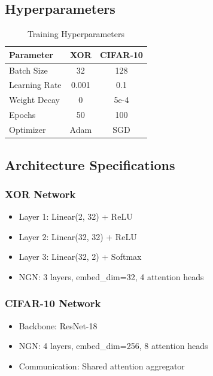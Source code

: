 \documentclass[11pt]{article}
\begin{document}
\subsection{Hyperparameters}

\begin{table}[H]
\centering
\caption{Training Hyperparameters}
\label{tab:hyperparams}
\begin{tabular}{@{}lcc@{}}
\toprule
Parameter & XOR & CIFAR-10 \\
\midrule
Batch Size & 32 & 128 \\
Learning Rate & 0.001 & 0.1 \\
Weight Decay & 0 & 5e-4 \\
Epochs & 50 & 100 \\
Optimizer & Adam & SGD \\
\bottomrule
\end{tabular}
\end{table}

\subsection{Architecture Specifications}

\subsubsection{XOR Network}
\begin{itemize}
    \item Layer 1: Linear(2, 32) + ReLU
    \item Layer 2: Linear(32, 32) + ReLU
    \item Layer 3: Linear(32, 2) + Softmax
    \item NGN: 3 layers, embed\_dim=32, 4 attention heads
\end{itemize}

\subsubsection{CIFAR-10 Network}
\begin{itemize}
    \item Backbone: ResNet-18
    \item NGN: 4 layers, embed\_dim=256, 8 attention heads
    \item Communication: Shared attention aggregator
\end{itemize}
\end{document}
